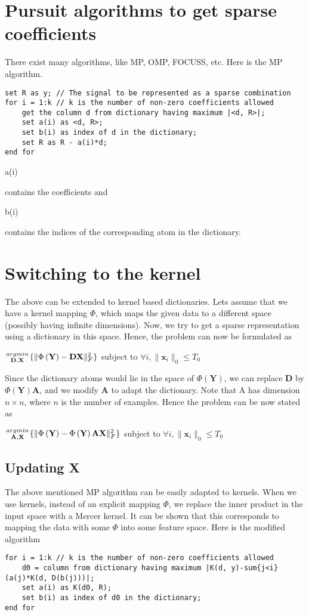 \documentclass[10pt,a4paper,final]{article}
\begin{document}
\section{Pursuit algorithms to get sparse coefficients}
There exist many algorithms, like MP, OMP, FOCUSS, etc. Here is the MP algorithm.
\begin{verbatim}
set R as y; // The signal to be represented as a sparse combination
for i = 1:k // k is the number of non-zero coefficients allowed
    get the column d from dictionary having maximum |<d, R>|;
    set a(i) as <d, R>;
    set b(i) as index of d in the dictionary;
    set R as R - a(i)*d;
end for
\end{verbatim} 
\begin{texttt}a(i)\end{texttt} contains the coefficients and \begin{texttt}b(i)\end{texttt} contains the indices of the corresponding atom in the dictionary. 
\section{Switching to the kernel}
The above can be extended to kernel based dictionaries. Lets assume that we have a kernel mapping $\Phi$, which maps the given data to a different space (possibly having infinite dimensions). Now, we try to get a sparse representation using a dictionary in this space. Hence, the problem can now be formulated as 
\begin{center}
$\genfrac{}{}{0pt}{}{argmin}{\mathbf{D},\mathbf{X}}\{\|\Phi\left(\mathbf{Y}\right)-\mathbf{DX}\|_F^2\}$ subject to $\forall i, \|\mathbf{x}_i\|_0 \leq T_0$
\end{center}
Since the dictionary atoms would lie in the space of $\Phi\left(\mathbf{Y}\right)$, we can replace $\mathbf{D}$ by $\Phi\left(\mathbf{Y}\right)\mathbf{A}$, and we modify $\mathbf{A}$ to adapt the dictionary. Note that A has dimension $n\times n$, where $n$ is the number of examples. Hence the problem can be now stated as 
\begin{center}
$\genfrac{}{}{0pt}{}{argmin}{\mathbf{A},\mathbf{X}}\{\|\Phi\left(\mathbf{Y}\right)-\Phi\left(\mathbf{Y}\right)\mathbf{AX}\|_F^2\}$ subject to $\forall i, \|\mathbf{x}_i\|_0 \leq T_0$
\end{center}
\subsection{Updating X}
The above mentioned MP algorithm can be easily adapted to kernels. When we use kernels, instead of an explicit mapping $\Phi$, we replace the inner product in the input space with a Mercer kernel. It can be shown that this corresponds to mapping the data with some $\Phi$ into some feature space. Here is the modified algorithm
\begin{verbatim}
for i = 1:k // k is the number of non-zero coefficients allowed
    d0 = column from dictionary having maximum |K(d, y)-sum{j<i}(a(j)*K(d, D(b(j)))|;
    set a(i) as K(d0, R);
    set b(i) as index of d0 in the dictionary;
end for
\end{verbatim}
\end{document}
